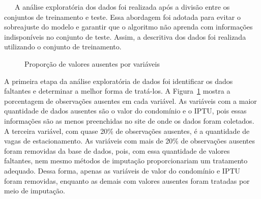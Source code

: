 \documentclass[
  12pt,
  a4paper,
]{scrreprt}
\begin{document}
~~~A análise exploratória dos dados foi realizada após a divisão entre
os conjuntos de treinamento e teste. Essa abordagem foi adotada para
evitar o sobreajuste do modelo e garantir que o algoritmo não aprenda
com informações indisponíveis no conjunto de teste. Assim, a descritiva
dos dados foi realizada utilizando o conjunto de treinamento.

\begin{figure}


\caption{\label{fig-miss}Proporção de valores ausentes por variáveis}

\end{figure}%

A primeira etapa da análise exploratória de dados foi identificar os
dados faltantes e determinar a melhor forma de tratá-los. A
Figura~\ref{fig-miss} mostra a porcentagem de observações ausentes em
cada variável. As variáveis com a maior quantidade de dados ausentes são
o valor do condomínio e o IPTU, pois essas informações são as menos
preenchidas no site de onde os dados foram coletados. A terceira
variável, com quase 20\% de observações ausentes, é a quantidade de
vagas de estacionamento. As variáveis com mais de 20\% de observações
ausentes foram removidas da base de dados, pois, com essa quantidade de
valores faltantes, nem mesmo métodos de imputação proporcionariam um
tratamento adequado. Dessa forma, apenas as variáveis de valor do
condomínio e IPTU foram removidas, enquanto as demais com valores
ausentes foram tratadas por meio de imputação.
\end{document}
